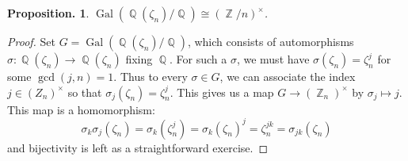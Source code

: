 \documentclass[11pt, a4paper]{memoir}
\DeclareMathOperator{\Q}{{\mathbb{Q}}}
\DeclareMathOperator{\Z}{{\mathbb{Z}}}
\theoremstyle{change}
\newtheorem{proposition}[theorem]{Proposition.}
\theoremstyle{plain}
\theoremstyle{nonumberplain}
\newtheorem{proof}{Proof}
\DeclareMathOperator{\Gal}{Gal}
\numberwithin{equation}{section}
\begin{document}
\begin{proposition}
    $\Gal(\Q(\zeta_n)/\Q)\cong(\Z/n)^\times$.
\end{proposition}
\begin{proof}
    Set $G=\Gal(\Q(\zeta_n)/\Q)$, which consists of automorphisms $\sigma:\Q(\zeta_n)\to\Q(\zeta_n)$ fixing $\Q$.
    For such a $\sigma$, we must have $\sigma(\zeta_n)=\zeta_n^j$ for some $\gcd(j,n)=1$.
    Thus to every $\sigma\in G$, we can associate the index $j\in(Z_n)^\times$ so that $\sigma_j(\zeta_n)=\zeta_n^j$.
    This gives us a map $G\to(\Z_n)^\times$ by $\sigma_j\mapsto j$.
    This map is a homomorphism:
    \begin{equation*}
        \sigma_k\sigma_j(\zeta_n)=\sigma_k(\zeta_n^j)=\sigma_k(\zeta_n)^j=\zeta_n^{jk}=\sigma_{jk}(\zeta_n)
    \end{equation*}
    and bijectivity is left as a straightforward exercise.
\end{proof}
\end{document}
